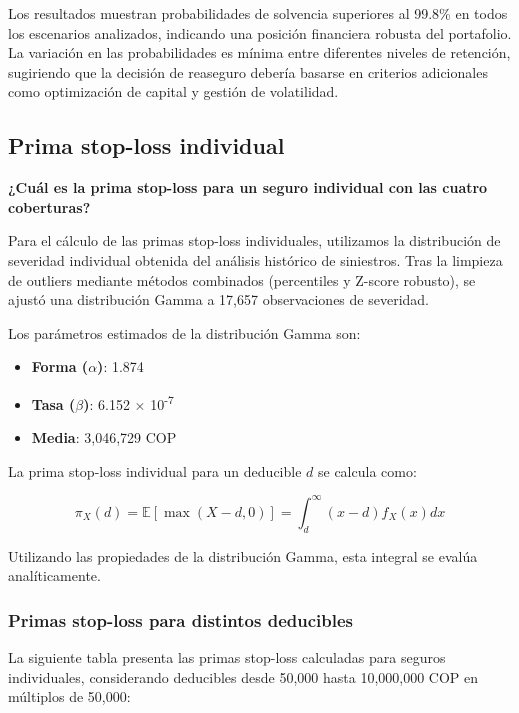 Los resultados muestran probabilidades de solvencia superiores al 99.8\% en todos los escenarios analizados, indicando una posición financiera robusta del portafolio. La variación en las probabilidades es mínima entre diferentes niveles de retención, sugiriendo que la decisión de reaseguro debería basarse en criterios adicionales como optimización de capital y gestión de volatilidad.



\subsection{Prima stop-loss individual}

\textbf{¿Cuál es la prima stop-loss para un seguro individual con las cuatro coberturas?}

Para el cálculo de las primas stop-loss individuales, utilizamos la distribución de severidad individual obtenida del análisis histórico de siniestros. Tras la limpieza de outliers mediante métodos combinados (percentiles y Z-score robusto), se ajustó una distribución Gamma a 17,657 observaciones de severidad.

Los parámetros estimados de la distribución Gamma son:
\begin{itemize}
\item \textbf{Forma ($\alpha$)}: 1.874
\item \textbf{Tasa ($\beta$)}: 6.152 × 10\textsuperscript{-7}
\item \textbf{Media}: 3,046,729 COP
\end{itemize}

La prima stop-loss individual para un deducible $d$ se calcula como:

$$\pi_X(d) = \mathbb{E}[\max(X - d, 0)] = \int_d^{\infty} (x - d) f_X(x) dx$$

Utilizando las propiedades de la distribución Gamma, esta integral se evalúa analíticamente.

\subsubsection{Primas stop-loss para distintos deducibles}

La siguiente tabla presenta las primas stop-loss calculadas para seguros individuales, considerando deducibles desde 50,000 hasta 10,000,000 COP en múltiplos de 50,000:

